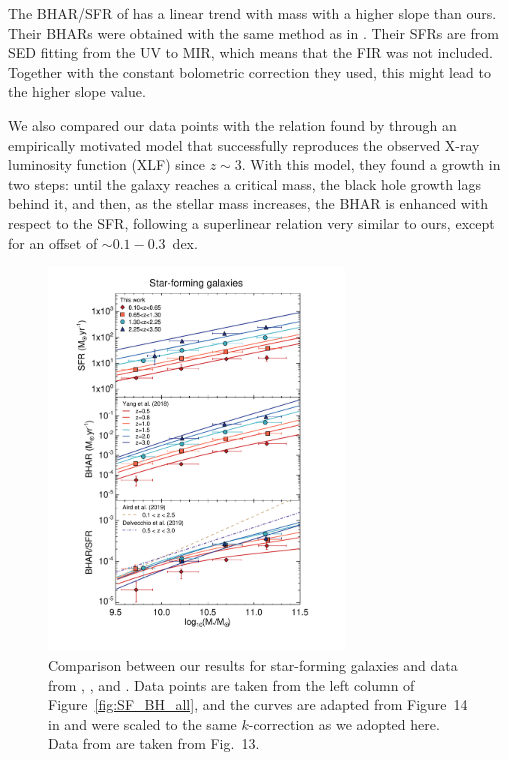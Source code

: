 The BHAR/SFR of \citet{2019MNRAS.484.4360A} has a linear trend with mass with a higher slope than ours. Their BHARs were obtained with the same method as in \citet{2018MNRAS.474.1225A}. Their SFRs are from SED fitting from the UV to MIR, which means that the FIR was not included. Together with the constant bolometric correction they used, this might lead to the higher slope value.
   
   We also compared our data points with the relation found by \citet{2019ApJ...885L..36D} through an empirically motivated model that successfully reproduces the observed X-ray luminosity function (XLF) since $z\sim3$. With this model, they found a growth in two steps: until the galaxy reaches a critical mass, the black hole growth lags behind it, and then, as the stellar mass increases, the BHAR is enhanced with respect to the SFR, following a superlinear relation very similar to ours, except for an offset of $\sim0.1-0.3$~dex.

   \begin{figure}%
   \centering
   \includegraphics[trim={1.8cm 1.5cm 2.3cm 0.8cm}, clip, width=0.7\textwidth]{Figs/SF_BH_SF_Yang.pdf}
      \caption{ Comparison between our results for star-forming galaxies and data from \citet{2018MNRAS.475.1887Y}, \citet{2019MNRAS.484.4360A}, and \citet{2019ApJ...885L..36D}.
            Data points are taken from the left column of Figure~\ref{fig:SF_BH_all}, and the curves are adapted from Figure~14 in \citet{2018MNRAS.475.1887Y} and were scaled to the same $k$-correction as we adopted here.
            Data from \citet{2019MNRAS.484.4360A} are taken from Fig.~13.
              }
         \label{fig:conf_yang}
   \end{figure}

